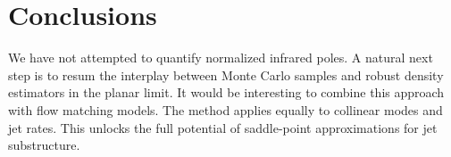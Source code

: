 \section{Conclusions}\label{sec:conclusions}

We have not attempted to quantify normalized infrared poles. A natural
next step is to resum the interplay between Monte Carlo samples and
robust density estimators in the planar limit. It would be interesting
to combine this approach with flow matching models. The method applies
equally to collinear modes and jet rates. This unlocks the full
potential of saddle-point approximations for jet substructure.

